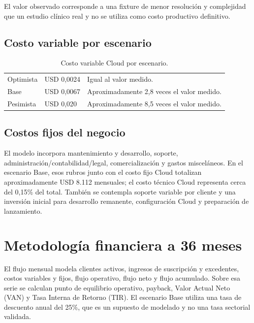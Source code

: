 El valor observado corresponde a una fixture de menor resolución y complejidad que un estudio clínico real y no se utiliza como costo productivo definitivo.

\subsection{Costo variable por escenario}

{\small
\begin{longtable}{>{\raggedright\arraybackslash}p{} >{\raggedright\arraybackslash}p{} >{\raggedright\arraybackslash}p{}}
\caption{Costo variable Cloud por escenario.}\label{tab:negocio-costo-variable}\\
\hline
Optimista & USD 0,0024 & Igual al valor medido. \\
Base & USD 0,0067 & Aproximadamente 2,8 veces el valor medido. \\
Pesimista & USD 0,020 & Aproximadamente 8,5 veces el valor medido. \\
\hline
\end{longtable}
}

\subsection{Costos fijos del negocio}

El modelo incorpora mantenimiento y desarrollo, soporte, administración/contabilidad/legal, comercialización y gastos misceláneos. En el escenario Base, esos rubros junto con el costo fijo Cloud totalizan aproximadamente USD 8.112 mensuales; el costo técnico Cloud representa cerca del 0,15\% del total. También se contempla soporte variable por cliente y una inversión inicial para desarrollo remanente, configuración Cloud y preparación de lanzamiento.

\section{Metodología financiera a 36 meses}

El flujo mensual modela clientes activos, ingresos de suscripción y excedentes, costos variables y fijos, flujo operativo, flujo neto y flujo acumulado. Sobre esa serie se calculan punto de equilibrio operativo, payback, Valor Actual Neto (VAN) y Tasa Interna de Retorno (TIR). El escenario Base utiliza una tasa de descuento anual del 25\%, que es un supuesto de modelado y no una tasa sectorial validada.

